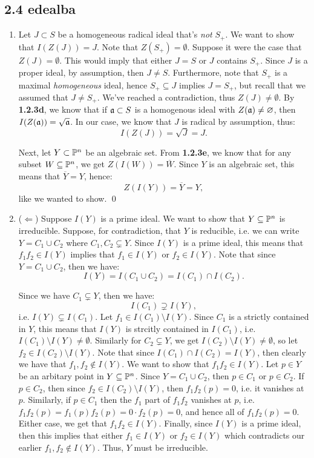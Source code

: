 \subsection*{2.4  {edealba}}

\begin{enumerate}
    \item Let $J \subset S$ be a homogeneous radical ideal that's \emph{not} $S_+$. We want to show that $I(Z(J)) = J$. Note that $Z(S_+) = \emptyset$. Suppose it were the case that $Z(J) = \emptyset$. This would imply that either $J = S$ or $J$ contains $S_+$. Since $J$ is a proper ideal, by assumption, then $J \neq S$. Furthermore, note that $S_+$ is a maximal \emph{homogeneous} ideal, hence $S_+ \subseteq J$ implies $J = S_+$, but recall that we assumed that $J \neq S_+$. We've reached a contradiction, thus $Z(J) \neq \emptyset$. By \textbf{1.2.3d}, we know that if $\a \subset S$ is a homogenous ideal with $Z(\a) \neq \emptyset$, then $I(Z(\a)) = \sqrt{\a}$. In our case, we know that $J$ is radical by assumption, thus:
$$ I(Z(J)) = \sqrt{J} = J. $$

Next, let $Y \subset \P^n$ be an algebraic set. From \textbf{1.2.3e}, we know that for any subset $W \subseteq \P^n$, we get $Z(I(W)) = \overline{W}$. Since $Y$ is an algebraic set, this means that $\overline{Y} = Y$, hence:
$$ Z(I(Y)) = \overline{Y} = Y, $$
like we wanted to show. \qed
    \item ($\Leftarrow$) Suppose $I(Y)$ is a prime ideal. We want to show that $Y \subseteq \P^n$ is irreducible. Suppose, for contradiction, that $Y$ is reducible, i.e. we can write $Y = C_1 \cup C_2$ where $C_1, C_2 \subsetneq Y$. Since $I(Y)$ is a prime ideal, this means that $f_1f_2 \in I(Y)$ implies that $f_1 \in I(Y)$ or $f_2 \in I(Y)$. Note that since $Y = C_1 \cup C_2$, then we have:
$$ I(Y) = I(C_1 \cup C_2) = I(C_1) \cap I(C_2). $$

Since we have $C_1 \subsetneq Y$, then we have:
$$ I(C_1) \supsetneq I(Y), $$
i.e. $I(Y) \subsetneq I(C_1)$. Let $f_1 \in I(C_1) \setminus I(Y)$. Since $C_1$ is a strictly contained in $Y$, this means that $I(Y)$ is strcitly contained in $I(C_1)$, i.e. $ I(C_1) \setminus I(Y) \neq \emptyset$. Similarly for $C_2 \subsetneq Y$, we get $I(C_2) \setminus I(Y) \neq \emptyset$, so let $f_2 \in I(C_2) \setminus I(Y)$. Note that since $I(C_1) \cap I(C_2) = I(Y)$, then clearly we have that $f_1, f_2 \notin I(Y)$. We want to show that $f_1f_2 \in I(Y)$. Let $p \in Y$ be an arbitary point in $Y \subseteq \P^n$. Since $Y = C_1 \cup C_2$, then $p \in C_1$ or $p \in C_2$. If $p \in C_2$, then since $f_2 \in I(C_2) \setminus I(Y)$, then $f_1f_2(p) = 0$, i.e. it vanishes at $p$. Similarly, if $p \in C_1$ then the $f_1$ part of $f_1f_2$ vanishes at $p$, i.e. $f_1f_2(p) = f_1(p)f_2(p) = 0\cdot f_2(p) = 0$, and hence all of $f_1f_2(p) = 0$. Either case, we get that $f_1f_2 \in I(Y)$. Finally, since $I(Y)$ is a prime ideal, then this implies that either $f_1 \in I(Y)$ or $f_2 \in I(Y)$ which contradicts our earlier $f_1, f_2 \notin I(Y)$. Thus, $Y$ must be irreducible.


\end{enumerate}

